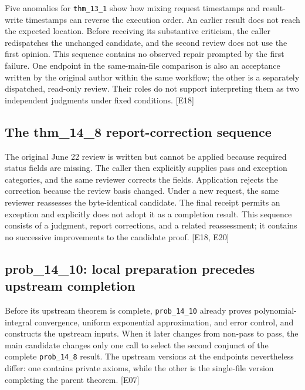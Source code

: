 Five anomalies for \nolinkurl{thm_13_1} show how mixing request timestamps and result-write timestamps can reverse the execution order. An earlier result does not reach the expected location. Before receiving its substantive criticism, the caller redispatches the unchanged candidate, and the second review does not use the first opinion. This sequence contains no observed repair prompted by the first failure. One endpoint in the same-main-file comparison is also an acceptance written by the original author within the same workflow; the other is a separately dispatched, read-only review. Their roles do not support interpreting them as two independent judgments under fixed conditions. [E18]

\subsection[The thm\_14\_8 report-correction sequence]{\texorpdfstring{\protect\hypertarget{b9}{}The thm\_14\_8 report-correction sequence}{The thm\_14\_8 report-correction sequence}}
The original June 22 review is written but cannot be applied because required status fields are missing. The caller then explicitly supplies pass and exception categories, and the same reviewer corrects the fields. Application rejects the correction because the review basis changed. Under a new request, the same reviewer reassesses the byte-identical candidate. The final receipt permits an exception and explicitly does not adopt it as a completion result. This sequence consists of a judgment, report corrections, and a related reassessment; it contains no successive improvements to the candidate proof. [E18, E20]

\subsection[prob\_14\_10: local preparation precedes upstream completion]{\texorpdfstring{\protect\hypertarget{b10}{}prob\_14\_10: local preparation precedes upstream completion}{prob\_14\_10: local preparation precedes upstream completion}}
Before its upstream theorem is complete, \nolinkurl{prob_14_10} already proves polynomial-integral convergence, uniform exponential approximation, and error control, and constructs the upstream inputs. When it later changes from non-pass to pass, the main candidate changes only one call to select the second conjunct of the complete \nolinkurl{prob_14_8} result. The upstream versions at the endpoints nevertheless differ: one contains private axioms, while the other is the single-file version completing the parent theorem. [E07]

